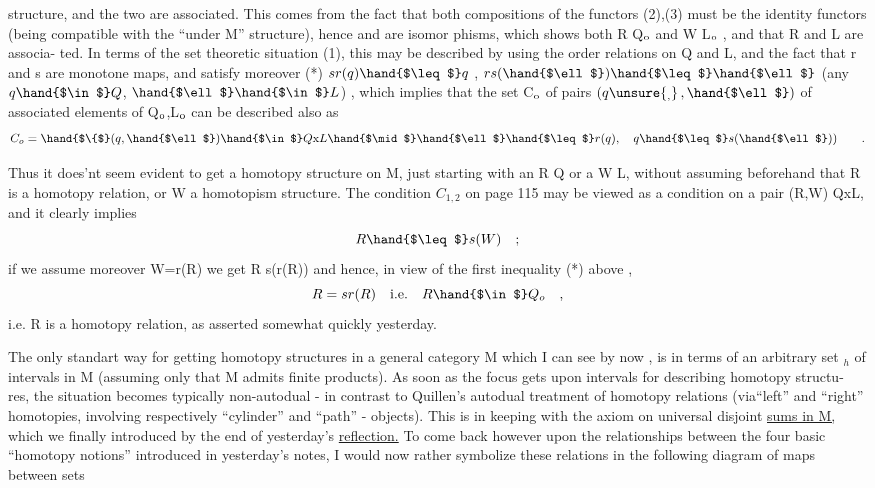 
structure, and the two are associated. This comes from the fact that
both compositions of the functors (2),(3) must be the identity functors
(being compatible with the ``under M'' structure), hence \hand{$\alpha$} and \hand{$\beta$} are isomor%
phisms, which shows both R \hand{$\in$} Q$_{\rm o}$ and W \hand{$\in$} L$_{\rm o}$ , and that R and L are associa-%
ted. In terms of the set theoretic situation (1), this may be described
by using the order relations on Q and L, and the fact that r and s are
monotone maps, and satisfy moreover
(*) \qquad $sr(q)\hand{$\leq$} q$ \;,\; $rs(\hand{$\ell$})\hand{$\leq$}\hand{$\ell$}$ \quad (any $q\hand{$\in$}Q$, $\hand{$\ell$}\hand{$\in$}L$) \;,
which implies that the set C$_{\rm o}$ of pairs $(q\unsure{_{,}}\,, \hand{$\ell$})$ of associated elements
of Q$_{\rm o}$,L$_{\rm o}$ can be described also as
\[ C_{o} = \hand{$\{$}(q,\hand{$\ell$})\hand{$\in$} Q\text{x}L \hand{$\mid$} \hand{$\ell$}\hand{$\leq$}r(q),\quad q\hand{$\leq$} s(\hand{$\ell$})) \qquad . \]

Thus it does'nt seem evident to get a homotopy structure on M, just
starting with an R \hand{$\in$} Q or  a W \hand{$\in$} L, without assuming beforehand that
R is a homotopy relation, or W a homotopism structure. The condition
$C_{1,2}$ on page 115 may be viewed as a condition on a pair (R,W)\hand{$\in$} QxL,
and it clearly implies
\[ R \hand{$\leq$} s(W) \quad ; \]
if we assume moreover \quad W=r(R) \quad we get \quad R\hand{$\leq$} s(r(R)) \quad and hence, in view
of the first inequality (*) above ,
\[ R = sr(R) \quad \text{i.e.} \quad R \hand{$\in$} Q_{o} \quad , \]
i.e. R is a homotopy relation, as asserted somewhat quickly yesterday.

The only standart way for getting homotopy structures in a general
category M which I  can see by now , is in terms of an arbitrary
set \hand{$\Sigma$}$_{h}$ of intervals in M (assuming only that M admits finite products).
As soon as the focus gets upon intervals for describing homotopy structu-%
res, the situation becomes typically non-autodual - in contrast to
Quillen's autodual treatment of homotopy relations (via``left'' and ``right''
homotopies, involving respectively ``cylinder'' and ``path'' - objects). 
This is in keeping with the  axiom on universal disjoint \uline{sums in M,} which
we finally introduced by the end of yesterday's \uline{reflection.}\hand{$|$} To come
back however upon the relationships between the four basic ``homotopy
notions'' introduced in yesterday's notes, I would now rather symbolize
these relations in the following diagram of maps between sets


